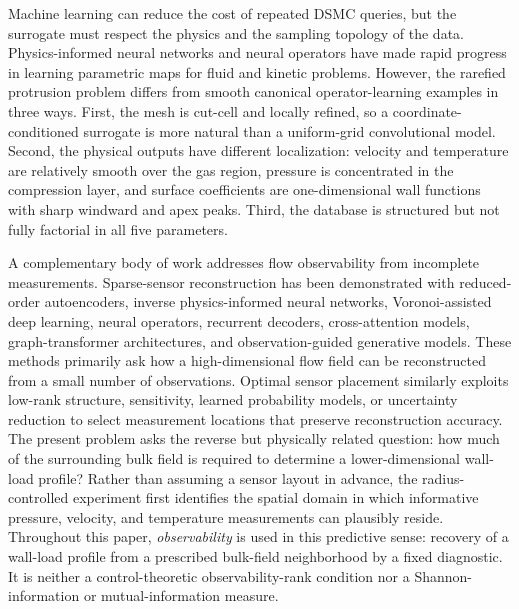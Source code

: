 \documentclass[aip,pof,preprint,floatfix,amsmath,amssymb]{revtex4-2}
\begin{document}
Machine learning can reduce the cost of repeated DSMC queries, but the surrogate must respect the physics and the sampling topology of the data. Physics-informed neural networks and neural operators have made rapid progress in learning parametric maps for fluid and kinetic problems.\cite{Raissi2019,Karniadakis2021,Lu2021,Maulik2020,Morimoto2022,Peyvan2026,RoohiMahdavi2026} However, the rarefied protrusion problem differs from smooth canonical operator-learning examples in three ways. First, the mesh is cut-cell and locally refined, so a coordinate-conditioned surrogate is more natural than a uniform-grid convolutional model. Second, the physical outputs have different localization: velocity and temperature are relatively smooth over the gas region, pressure is concentrated in the compression layer, and surface coefficients are one-dimensional wall functions with sharp windward and apex peaks. Third, the database is structured but not fully factorial in all five parameters. 


A complementary body of work addresses flow observability from incomplete measurements. Sparse-sensor reconstruction has been demonstrated with reduced-order autoencoders, inverse physics-informed neural networks, Voronoi-assisted deep learning, neural operators, recurrent decoders, cross-attention models, graph-transformer architectures, and observation-guided generative models.\cite{Luo2023Sparse,HosseiniShiri2024,Fukami2021Sparse,Santos2023Senseiver,Zhao2024RecFNO,Williams2024SHRED,Kong2025CrossAttention,Wang2025Generative,Zhang2026Sparse} These methods primarily ask how a high-dimensional flow field can be reconstructed from a small number of observations. Optimal sensor placement similarly exploits low-rank structure, sensitivity, learned probability models, or uncertainty reduction to select measurement locations that preserve reconstruction accuracy.\cite{Manohar2018,Erichson2020,Liang2026Sensor} The present problem asks the reverse but physically related question: how much of the surrounding bulk field is required to determine a lower-dimensional wall-load profile? Rather than assuming a sensor layout in advance, the radius-controlled experiment first identifies the spatial domain in which informative pressure, velocity, and temperature measurements can plausibly reside. Throughout this paper, \emph{observability} is used in this predictive sense: recovery of a wall-load profile from a prescribed bulk-field neighborhood by a fixed diagnostic. It is neither a control-theoretic observability-rank condition nor a Shannon-information or mutual-information measure.
\end{document}
